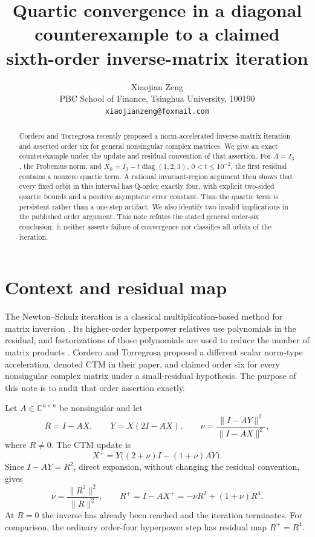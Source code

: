 \documentclass[11pt]{article}
\title{Quartic convergence in a diagonal counterexample to a claimed\\
sixth-order inverse-matrix iteration}
\author{Xiaojian Zeng\\
PBC School of Finance, Tsinghua University, 100190\\
\texttt{xiaojianzeng@foxmail.com}}
\date{}
\newcommand{\C}{\mathbb C}
\newcommand{\norm}[1]{\lVert #1\rVert}
\DeclareMathOperator{\diag}{diag}
\begin{document}
\maketitle

\begin{abstract}
Cordero and Torregrosa recently proposed a norm-accelerated inverse-matrix
iteration and asserted order six for general nonsingular complex matrices.  We
give an exact counterexample under the update and residual convention of that
assertion.  For $A=I_3$, the Frobenius norm, and
$X_0=I_3-t\diag(1,2,3)$, $0<t\leq 10^{-2}$, the first residual contains a
nonzero quartic term.  A rational invariant-region argument then shows that
every fixed orbit in this interval has Q-order exactly four, with explicit
two-sided quartic bounds and a positive asymptotic error constant.  Thus the
quartic term is persistent rather than a one-step artifact.  We also identify
two invalid implications in the published order argument.  This note refutes
the stated general order-six conclusion; it neither asserts failure of
convergence nor classifies all orbits of the iteration.
\end{abstract}

\section{Context and residual map}

The Newton--Schulz iteration is a classical multiplication-based method for
matrix inversion \cite{Schulz1933}.  Its higher-order hyperpower relatives use
polynomials in the residual, and factorizations of those polynomials are used
to reduce the number of matrix products \cite{PetkovicPetkovic2015}.  Cordero
and Torregrosa \cite{CorderoTorregrosa2026} proposed a different scalar
norm-type acceleration, denoted CTM in their paper, and claimed order six for
every nonsingular complex matrix under a small-residual hypothesis.  The
purpose of this note is to audit that order assertion exactly.

Let $A\in\C^{n\times n}$ be nonsingular and let
\[
 R=I-AX,\qquad Y=X(2I-AX),\qquad
 \nu=\frac{\norm{I-AY}^{2}}{\norm{I-AX}^{2}},
\]
where $R\ne0$.  The CTM update is
\[
 X^+=Y\bigl((2+\nu)I-(1+\nu)AY\bigr).
\]
Since $I-AY=R^2$, direct expansion, without changing the residual convention,
gives
\begin{equation}
 \nu=\frac{\norm{R^2}^{2}}{\norm R^{2}},\qquad
 R^+=I-AX^+=-\nu R^2+(1+\nu)R^4.
\end{equation}
At $R=0$ the inverse has already been reached and the iteration terminates.
For comparison, the ordinary order-four hyperpower step has residual map
$R^+=R^4$.
\end{document}
